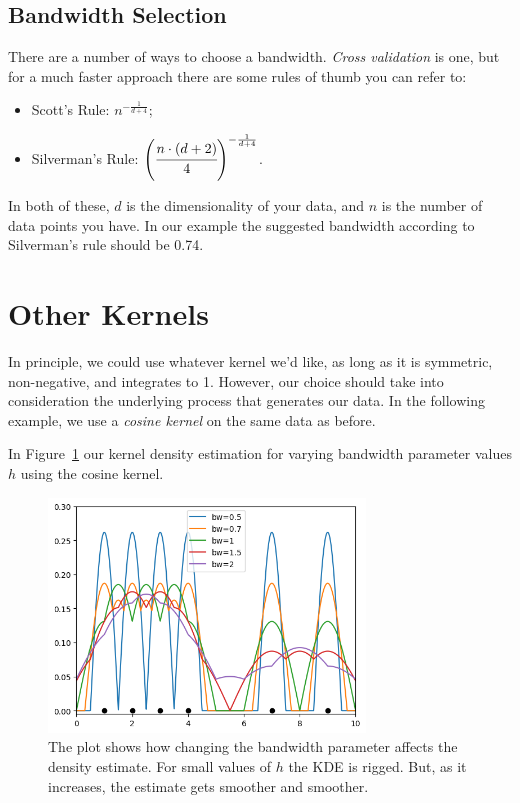 \subsection{Bandwidth Selection}

There are a number of ways to choose a bandwidth. \emph{Cross validation} is one, but for a much faster approach there are some rules of thumb you can refer to:
\begin{itemize}
\item Scott's Rule: $n^{-\frac{1}{d + 4}}$;
\item Silverman's Rule: $\left(\cfrac{n \cdot (d + 2)}{4}\right)^{-\frac{1}{d + 4}}$.
\end{itemize}

In both of these, $d$ is the dimensionality of your data, and $n$ is the number of data points you have. 
In our example the suggested bandwidth according to Silverman's rule should be 0.74.

\section{Other Kernels}

In principle, we could use whatever kernel we'd like, as long as it is symmetric, non-negative, and integrates to 1. However, our choice should take into consideration the underlying process that generates our data. In the following example, we use a \emph{cosine kernel} on the same data as before.

In Figure~\ref{fig:kde_cosine_kernel} our kernel density estimation for varying bandwidth parameter values $h$ using the cosine kernel.


\begin{figure}[htb]
\centering
\includegraphics[width=0.75\textwidth]{figures/kde_cosine_kernel}
\caption{The plot shows how changing the bandwidth parameter affects the density estimate. For small values of $h$ the KDE is rigged. But, as it increases, the estimate gets smoother and smoother.}
\label{fig:kde_cosine_kernel}
\end{figure}

